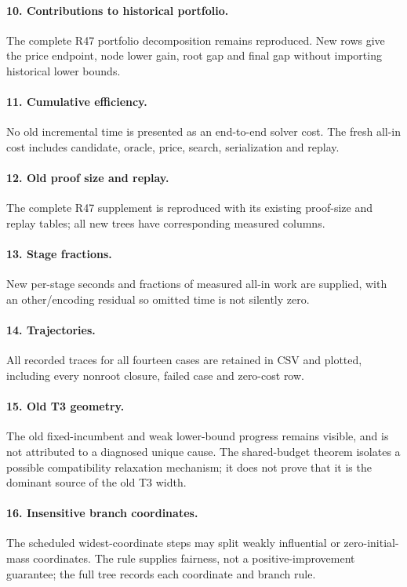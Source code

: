 \paragraph{10. Contributions to historical portfolio.} The complete R47 portfolio decomposition remains reproduced. New rows give the price endpoint, node lower gain, root gap and final gap without importing historical lower bounds.

\paragraph{11. Cumulative efficiency.} No old incremental time is presented as an end-to-end solver cost. The fresh all-in cost includes candidate, oracle, price, search, serialization and replay.

\paragraph{12. Old proof size and replay.} The complete R47 supplement is reproduced with its existing proof-size and replay tables; all new trees have corresponding measured columns.

\paragraph{13. Stage fractions.} New per-stage seconds and fractions of measured all-in work are supplied, with an other/encoding residual so omitted time is not silently zero.

\paragraph{14. Trajectories.} All recorded traces for all fourteen cases are retained in CSV and plotted, including every nonroot closure, failed case and zero-cost row.

\paragraph{15. Old T3 geometry.} The old fixed-incumbent and weak lower-bound progress remains visible, and is not attributed to a diagnosed unique cause. The shared-budget theorem isolates a possible compatibility relaxation mechanism; it does not prove that it is the dominant source of the old T3 width.

\paragraph{16. Insensitive branch coordinates.} The scheduled widest-coordinate steps may split weakly influential or zero-initial-mass coordinates. The rule supplies fairness, not a positive-improvement guarantee; the full tree records each coordinate and branch rule.

